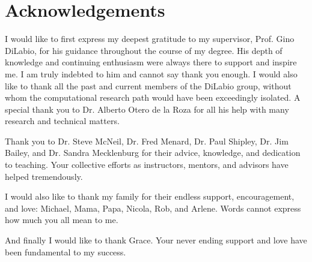 
\chapter{Acknowledgements}      %

\begin{doublespace}

I would like to first express my deepest gratitude to my supervisor, Prof. Gino
DiLabio, for his guidance throughout the course of my degree. His depth of
knowledge and continuing enthusiasm were always there to support and inspire
me. I am truly indebted to him and cannot say thank you enough. I would also
like to thank all the past and current members of the DiLabio group, without
whom the computational research path would have been exceedingly isolated. A
special thank you to Dr. Alberto Otero de la Roza for all his help with many
research and technical matters.

Thank you to Dr. Steve McNeil, Dr. Fred Menard, Dr. Paul Shipley, Dr. Jim
Bailey, and Dr. Sandra Mecklenburg for their advice, knowledge, and dedication
to teaching. Your collective efforts as instructors, mentors, and advisors have
helped tremendously.

I would also like to thank my family for their endless support, encouragement,
and love: Michael, Mama, Papa, Nicola, Rob, and Arlene. Words cannot express how
much you all mean to me.

And finally I would like to thank Grace. Your never ending support and love have
been fundamental to my success.

\end{doublespace}

